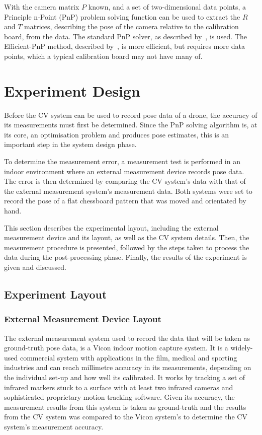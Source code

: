 With the camera matrix $P$ known, and a set of two-dimensional data points, a Principle n-Point (PnP) problem solving function can be used to extract the $R$ and $T$ matrices, describing the pose of the camera relative to the calibration board, from the data. The standard PnP solver, as described by~\cite{Schweighofer2006}, is used. The Efficient-PnP method, described by~\cite{Lepetit2008}, is more efficient, but requires more data points, which a typical calibration board may not have many of.

\section{Experiment Design}

Before the CV system can be used to record pose data of a drone, the accuracy of its measurements must first be determined. Since the PnP solving algorithm is, at its core, an optimisation problem and produces pose estimates, this is an important step in the system design phase. 

To determine the measurement error, a measurement test is performed in an indoor environment where an external measurement device records pose data. The error is then determined by comparing the CV system's data with that of the external measurement system's measurement data. Both systems were set to record the pose of a flat chessboard pattern that was moved and orientated by hand.

This section describes the experimental layout, including the external measurement device and its layout, as well as the CV system details. Then, the measurement procedure is presented, followed by the steps taken to process the data during the post-processing phase. Finally, the results of the experiment is given and discussed. 

\subsection{Experiment Layout}

\subsubsection{External Measurement Device Layout}

The external measurement system used to record the data that will be taken as ground-truth pose data, is a Vicon indoor motion capture system. It is a widely-used commercial system with applications in the film, medical and sporting industries and can reach millimetre accuracy in its measurements, depending on the individual set-up and how well its calibrated. It works by tracking a set of infrared markers stuck to a surface with at least two infrared cameras and sophisticated proprietary motion tracking software. Given its accuracy, the measurement results from this system is taken as ground-truth and the results from the CV system was compared to the Vicon system's to determine the CV system's measurement accuracy. 

